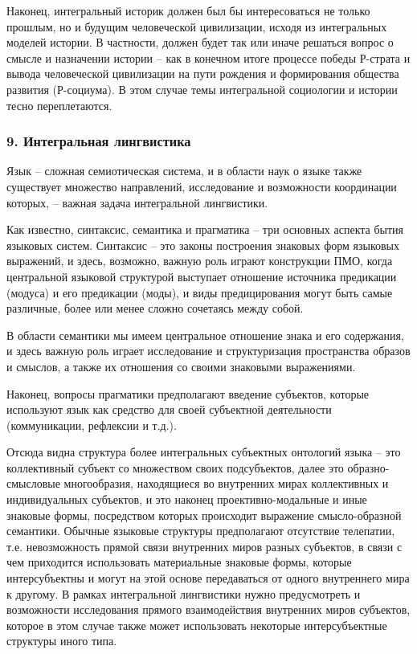     Наконец, интегральный историк должен был бы интересоваться не только прошлым, но и будущим человеческой цивилизации, исходя из интегральных моделей истории. В частности, должен будет так или иначе решаться вопрос о смысле и назначении истории – как в конечном итоге процессе победы Р-страта и вывода человеческой цивилизации на пути рождения и формирования общества развития (Р-социума). В этом случае темы интегральной социологии и истории тесно переплетаются.

    \subsubsection*{9. Интегральная лингвистика}
    Язык – сложная семиотическая система, и в области наук о языке также существует множество направлений, исследование и возможности координации которых, – важная задача интегральной лингвистики.

    Как известно, синтаксис, семантика и прагматика – три основных аспекта бытия языковых систем. Синтаксис – это законы построения знаковых форм языковых выражений, и здесь, возможно, важную роль играют конструкции ПМО, когда центральной языковой структурой выступает отношение источника предикации (модуса) и его предикации (моды), и виды предицирования могут быть самые различные, более или менее сложно сочетаясь между собой.

    В области семантики мы имеем центральное отношение знака и его содержания, и здесь важную роль играет исследование и структуризация пространства образов и смыслов, а также их отношения со своими знаковыми выражениями.

    Наконец, вопросы прагматики предполагают введение субъектов, которые используют язык как средство для своей субъектной деятельности (коммуникации, рефлексии и т.д.).

    Отсюда видна структура более интегральных субъектных онтологий языка – это коллективный субъект со множеством своих подсубъектов, далее это образно-смысловые многообразия, находящиеся во внутренних мирах коллективных и индивидуальных субъектов, и это наконец проективно-модальные и иные знаковые формы, посредством которых происходит выражение смысло-образной семантики. Обычные языковые структуры предполагают отсутствие телепатии, т.е. невозможность прямой связи внутренних миров разных субъектов, в связи с чем приходится использовать материальные знаковые формы, которые интерсубъектны и могут на этой основе передаваться от одного внутреннего мира к другому. В рамках интегральной лингвистики нужно предусмотреть и возможности исследования прямого взаимодействия внутренних миров субъектов, которое в этом случае также может использовать некоторые интерсубъектные структуры иного типа.

